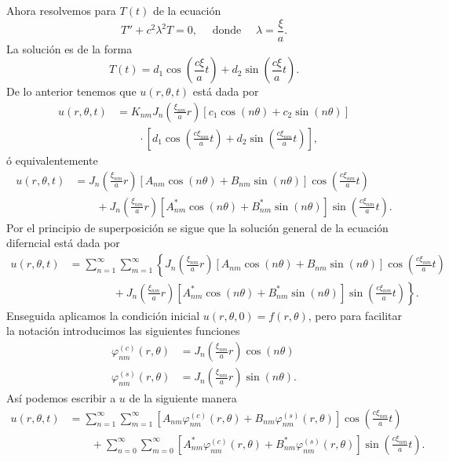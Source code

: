 \documentclass[11pt,letterpaper,draft]{report}
\theoremstyle{plain}
\theoremstyle{definition}
\theoremstyle{remark}
\newcommand\<{\langle}
\renewcommand\>{\rangle}
\renewcommand\phi\varphi
\begin{document}
\noindent Ahora resolvemos para $T(t)$ de la ecuación
\[
  T'' + c^2\lambda^2T = 0, \quad \text{ donde } \quad \lambda = \frac{\xi}{a}.
\] La solución es de la forma
\[
  T(t) = d_1 \cos\left(\frac{c\xi}{a}t\right) + d_2 \sin\left(\frac{c\xi}{a} t\right).
\] De lo anterior tenemos que $u(r,\theta,t)$ está dada por
\begin{align*}
  u(r,\theta,t) &= K_{nm} J_n\left(\frac{\xi_{nm}}{a}r\right)\left[c_1 \cos(n\theta) + c_2 \sin(n\theta)\right]\\
                &\quad\quad \cdot \left[d_1 \cos\left(\frac{c\xi_{nm}}{a}t\right) + d_2 \sin\left(\frac{c\xi_{nm}}{a}t\right)\right],
\end{align*}
ó equivalentemente
\begin{align*}
  u(r,\theta,t) &= J_n\left(\frac{\xi_{nm}}{a}r\right)\left[A_{nm}\cos(n\theta) + B_{nm}\sin(n\theta)\right]\cos\left(\frac{c\xi_{nm}}{a}t\right)\\
                &\quad\quad + J_n\left(\frac{\xi_{nm}}{a}r\right)\left[A_{nm}^{\ast}\cos(n\theta) + B_{nm}^{\ast}\sin(n\theta)\right]\sin\left(\frac{c\xi_{nm}}{a}t\right).
\end{align*} 
Por el principio de superposición se sigue que la solución general de la ecuación diferncial está dada por
\begin{align*}
  u(r,\theta,t) &= \sum_{n=1}^{\infty}\sum_{m=1}^{\infty} \left\{ J_n\left(\frac{\xi_{nm}}{a}r\right)\left[A_{nm}\cos(n\theta) + B_{nm}\sin(n\theta)\right]\cos\left(\frac{c\xi_{nm}}{a}t\right)\right.\\
                &\quad\quad\quad\quad + \left.J_n\left(\frac{\xi_{nm}}{a}r\right)\left[A_{nm}^{\ast}\cos(n\theta) + B_{nm}^{\ast}\sin(n\theta)\right]\sin\left(\frac{c\xi_{nm}}{a}t\right)\right\}.
\end{align*} 
Enseguida aplicamos la condición inicial $u(r,\theta,0) = f(r,\theta)$, pero para facilitar la notación introducimos las siguientes funciones
\begin{align*}
  \phi_{nm}^{(c)}(r,\theta) &= J_n\left(\frac{\xi_{nm}}{a} r\right)\cos(n\theta)\\
  \phi_{nm}^{(s)}(r,\theta) &= J_n\left(\frac{\xi_{nm}}{a}r\right)\sin(n\theta).
\end{align*} Así podemos escribir a $u$ de la siguiente manera
\begin{align*}
  u(r,\theta,t) &= \sum_{n=1}^{\infty}\sum_{m=1}^{\infty}
              \left[
              A_{nm}\phi_{nm}^{(c)}(r,\theta)
              + B_{nm}\phi_{nm}^{(s)}(r,\theta)
              \right]
              \cos
              \left(
              \frac{c\xi_{nm}}{a}t
              \right)\\
           &\quad\quad + \sum_{n=0}^{\infty}\sum_{m=0}^{\infty}
              \left[
              A_{nm}^{\ast}\phi_{nm}^{(c)}(r,\theta)
              + B_{nm}^{\ast}\phi_{nm}^{(s)}(r,\theta)
              \right]
              \sin
              \left(
              \frac{c\xi_{nm}}{a}t
              \right).
\end{align*}
\end{document}
